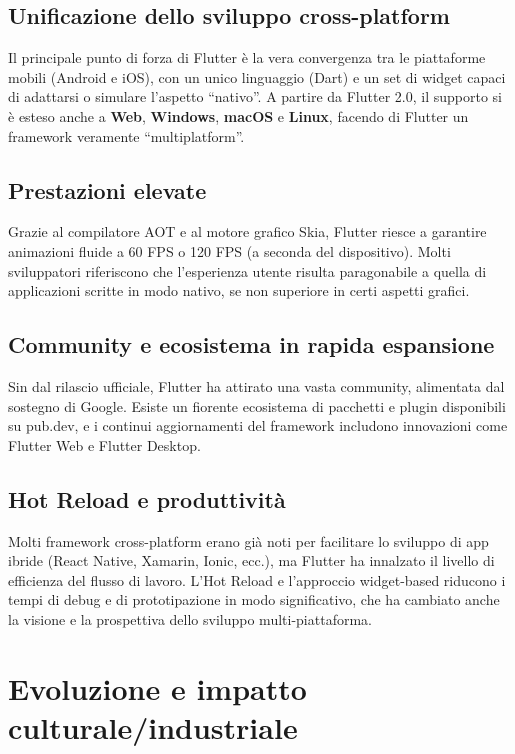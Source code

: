 \documentclass[14pt]{extbook}
\begin{document}
\subsection{Unificazione dello sviluppo cross-platform}
Il principale punto di forza di Flutter è la vera convergenza tra le piattaforme mobili (Android e iOS), con un unico linguaggio (Dart) e un set di widget capaci di adattarsi o simulare l’aspetto “nativo”. A partire da Flutter 2.0, il supporto si è esteso anche a \textbf{Web}, \textbf{Windows}, \textbf{macOS} e \textbf{Linux}, facendo di Flutter un framework veramente “multiplatform”.\\

\subsection{Prestazioni elevate}
Grazie al compilatore AOT e al motore grafico Skia, Flutter riesce a garantire animazioni fluide a 60 FPS o 120 FPS (a seconda del dispositivo). Molti sviluppatori riferiscono che l’esperienza utente risulta paragonabile a quella di applicazioni scritte in modo nativo, se non superiore in certi aspetti grafici.\\

\subsection{Community e ecosistema in rapida espansione}
Sin dal rilascio ufficiale, Flutter ha attirato una vasta community, alimentata dal sostegno di Google. Esiste un fiorente ecosistema di pacchetti e plugin disponibili su pub.dev, e i continui aggiornamenti del framework includono innovazioni come Flutter Web e Flutter Desktop.\\

\subsection{Hot Reload e produttività}
Molti framework cross-platform erano già noti per facilitare lo sviluppo di app ibride (React Native, Xamarin, Ionic, ecc.), ma Flutter ha innalzato il livello di efficienza del flusso di lavoro. L’Hot Reload e l’approccio widget-based riducono i tempi di debug e di prototipazione in modo significativo, che ha cambiato anche la visione e la prospettiva dello sviluppo multi-piattaforma.
\pagebreak

\section{Evoluzione e impatto culturale/industriale}
\end{document}

